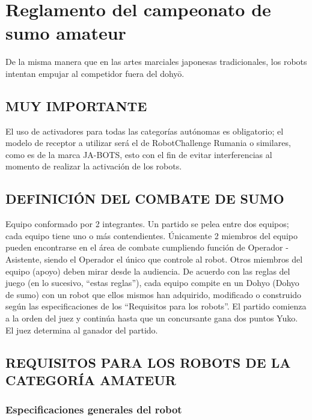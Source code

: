 \documentclass[
  letterpaper,
  DIV=11,
  numbers=noendperiod]{scrreprt}
\begin{document}

\chapter{Reglamento del campeonato de sumo
amateur}\label{reglamento-del-campeonato-de-sumo-amateur}

De la misma manera que en las artes marciales japonesas tradicionales,
los robots intentan empujar al competidor fuera del dohyō.

\section{MUY IMPORTANTE}\label{muy-importante}

El uso de activadores para todas las categorías autónomas es
obligatorio; el modelo de receptor a utilizar será el de RobotChallenge
Rumania o similares, como es de la marca JA-BOTS, esto con el fin de
evitar interferencias al momento de realizar la activación de los
robots.

\section{DEFINICIÓN DEL COMBATE DE
SUMO}\label{definiciuxf3n-del-combate-de-sumo}

Equipo conformado por 2 integrantes. Un partido se pelea entre dos
equipos; cada equipo tiene uno o más contendientes. Únicamente 2
miembros del equipo pueden encontrarse en el área de combate cumpliendo
función de Operador - Asistente, siendo el Operador el único que
controle al robot. Otros miembros del equipo (apoyo) deben mirar desde
la audiencia. De acuerdo con las reglas del juego (en lo sucesivo,
``estas reglas''), cada equipo compite en un Dohyo (Dohyo de sumo) con
un robot que ellos mismos han adquirido, modificado o construido según
las especificaciones de los ``Requisitos para los robots''. El partido
comienza a la orden del juez y continúa hasta que un concursante gana
dos puntos Yuko. El juez determina al ganador del partido.

\section{REQUISITOS PARA LOS ROBOTS DE LA CATEGORÍA
AMATEUR}\label{requisitos-para-los-robots-de-la-categoruxeda-amateur}

\subsection{Especificaciones generales del
robot}\label{especificaciones-generales-del-robot}
\end{document}
